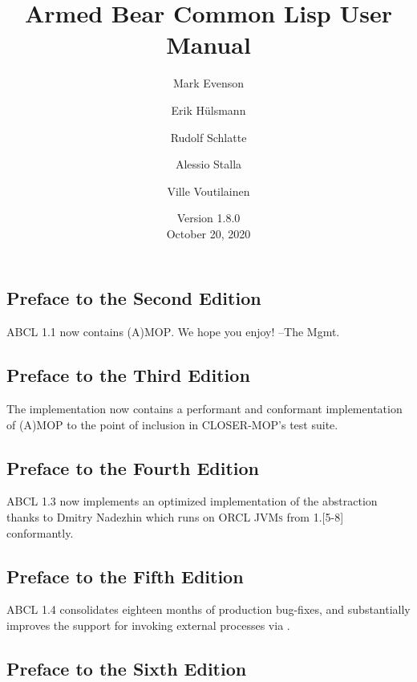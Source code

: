 \documentclass[10pt]{book}
\begin{document}
\title{Armed Bear Common Lisp User Manual}
\date{Version 1.8.0\\
\smallskip
October 20, 2020}
\author{Mark Evenson \and Erik H\"{u}lsmann \and Rudolf Schlatte \and
  Alessio Stalla \and Ville Voutilainen}

\maketitle

\tableofcontents
\subsection{Preface to the Second Edition}
\textsc{ABCL} 1.1 now contains \textsc{(A)MOP}.  We hope you enjoy!
--The Mgmt.

\subsection{Preface to the Third Edition}
The implementation now contains a performant and conformant
implementation of \textsc{(A)MOP} to the point of inclusion in
\textsc{CLOSER-MOP}'s test suite.

\subsection{Preface to the Fourth Edition}

\textsc{ABCL} 1.3 now implements an optimized implementation of the
 abstraction thanks to Dmitry
Nadezhin which runs on ORCL \textsc{JVMs} from 1.[5-8] conformantly.

\subsection{Preface to the Fifth Edition}

\textsc{ABCL} 1.4 consolidates eighteen months of production bug-fixes,
and substantially improves the support for invoking external
processes via .

\subsection{Preface to the Sixth Edition}
\end{document}
